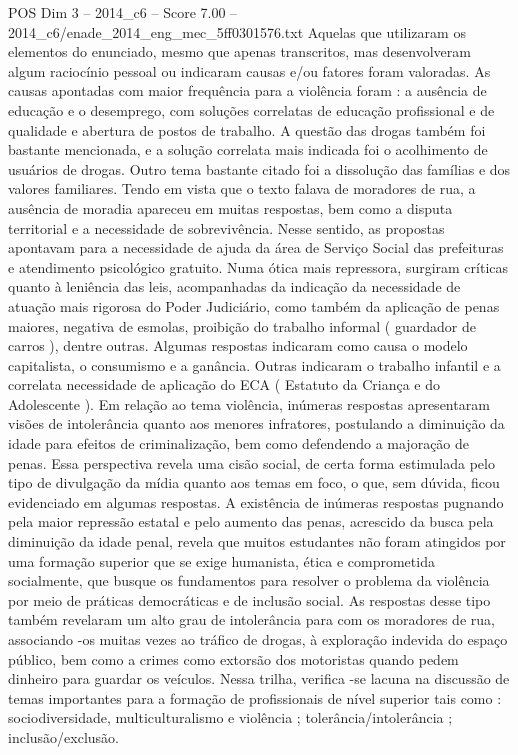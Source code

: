 \begin{textsample}{POS Dim 3 – 2014\_c6 – Score 7.00 – 2014\_c6/enade\_2014\_eng\_mec\_5ff0301576.txt}
Aquelas que utilizaram os elementos do enunciado, mesmo que apenas transcritos, mas desenvolveram algum raciocínio pessoal ou indicaram causas e/ou fatores foram valoradas.
As causas apontadas com maior frequência para a violência foram : a ausência de educação e o desemprego, com soluções correlatas de educação profissional e de qualidade e abertura de postos de trabalho.
A questão das drogas também foi bastante mencionada, e a solução correlata mais indicada foi o acolhimento de usuários de drogas.
Outro tema bastante citado foi a dissolução das famílias e dos valores familiares.
Tendo em vista que o texto falava de moradores de rua, a ausência de moradia apareceu em muitas respostas, bem como a disputa territorial e a necessidade de sobrevivência.
Nesse sentido, as propostas apontavam para a necessidade de ajuda da área de Serviço Social das prefeituras e atendimento psicológico gratuito.
Numa ótica mais repressora, surgiram críticas quanto à leniência das leis, acompanhadas da indicação da necessidade de atuação mais rigorosa do Poder Judiciário, como também da aplicação de penas maiores, negativa de esmolas, proibição do trabalho informal ( guardador de carros ), dentre outras.
Algumas respostas indicaram como causa o modelo capitalista, o consumismo e a ganância.
Outras indicaram o trabalho infantil e a correlata necessidade de aplicação do ECA ( Estatuto da Criança e do Adolescente ).
Em relação ao tema violência, inúmeras respostas apresentaram visões de intolerância quanto aos menores infratores, postulando a diminuição da idade para efeitos de criminalização, bem como defendendo a majoração de penas.
Essa perspectiva revela uma cisão social, de certa forma estimulada pelo tipo de divulgação da mídia quanto aos temas em foco, o que, sem dúvida, ficou evidenciado em algumas respostas.
A existência de inúmeras respostas pugnando pela maior repressão estatal e pelo aumento das penas, acrescido da busca pela diminuição da idade penal, revela que muitos estudantes não foram atingidos por uma formação superior que se exige humanista, ética e comprometida socialmente, que busque os fundamentos para resolver o problema da violência por meio de práticas democráticas e de inclusão social.
As respostas desse tipo também revelaram um alto grau de intolerância para com os moradores de rua, associando -os muitas vezes ao tráfico de drogas, à exploração indevida do espaço público, bem como a crimes como extorsão dos motoristas quando pedem dinheiro para guardar os veículos.
Nessa trilha, verifica -se lacuna na discussão de temas importantes para a formação de profissionais de nível superior tais como : sociodiversidade, multiculturalismo e violência ; tolerância/intolerância ; inclusão/exclusão.

\end{textsample}
